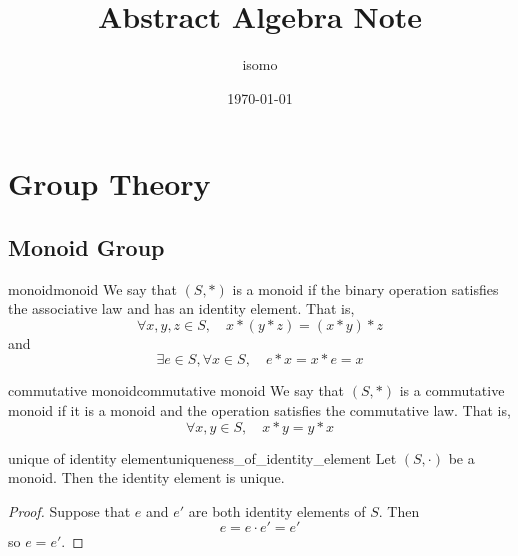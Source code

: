 \documentclass[11pt,lang=en]{elegantbook}
\title{Abstract Algebra Note}
\author{isomo}
\date{\today}
\begin{document}
\maketitle

\frontmatter
\tableofcontents

\mainmatter

\chapter{Group Theory}

\section{Monoid Group}

\begin{definition}{monoid}{monoid}
  We say that $(S, \ast)$ is a monoid if the binary operation satisfies the associative law and has an identity element. That is,
  \[
  \forall x, y, z \in S, \quad x \ast (y \ast z) = (x \ast y) \ast z
  \]
  and
  \[
  \exists e \in S, \forall x \in S, \quad e \ast x = x \ast e = x
  \]
\end{definition}


\begin{definition}{commutative monoid}{commutative monoid}
  We say that $(S, \ast)$ is a commutative monoid if it is a monoid and the operation satisfies the commutative law. That is,
  \[
  \forall x, y \in S, \quad x \ast y = y \ast x
  \]
\end{definition}

\begin{proposition}{unique of identity element}{uniqueness_of_identity_element}
  Let $(S, \cdot)$ be a monoid. Then the identity element is unique.
\end{proposition}
\begin{proof}
  Suppose that $e$ and $e'$ are both identity elements of $S$. Then
  \[
  e = e \cdot e' = e'
  \]
  so $e = e'$.
\end{proof}
\end{document}
